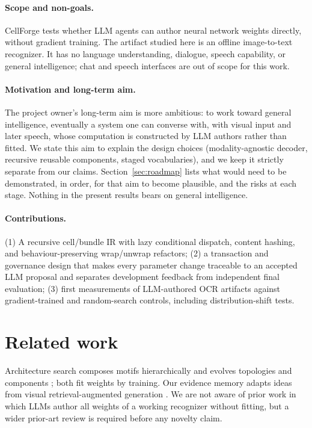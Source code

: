 \documentclass[11pt]{article}
\begin{document}
\paragraph{Scope and non-goals.}
CellForge tests whether LLM agents can author neural network weights directly, without
gradient training. The artifact studied here is an offline image-to-text recognizer. It has
no language understanding, dialogue, speech capability, or general intelligence; chat and
speech interfaces are out of scope for this work.

\paragraph{Motivation and long-term aim.}
The project owner's long-term aim is more ambitious: to work toward general intelligence,
eventually a system one can converse with, with visual input and later speech, whose
computation is constructed by LLM authors rather than fitted. We state this aim to explain
the design choices (modality-agnostic decoder, recursive reusable components, staged
vocabularies), and we keep it strictly separate from our claims. Section~\ref{sec:roadmap}
lists what would need to be demonstrated, in order, for that aim to become plausible, and
the risks at each stage. Nothing in the present results bears on general intelligence.

\paragraph{Contributions.}
(1) A recursive cell/bundle IR with lazy conditional dispatch, content hashing, and
behaviour-preserving wrap/unwrap refactors; (2) a transaction and governance design that
makes every parameter change traceable to an accepted LLM proposal and separates
development feedback from independent final evaluation; (3) first measurements of
LLM-authored OCR artifacts against gradient-trained and random-search controls, including
distribution-shift tests.

\section{Related work}
Architecture search composes motifs hierarchically \cite{liu2018hierarchical} and evolves
topologies and components \cite{miikkulainen2017evolving}; both fit weights by training.
Our evidence memory adapts ideas from visual retrieval-augmented generation
\cite{yu2024visrag,sun2025visrag2,wang2026vimrag}. We are not aware of prior work in which
LLMs author all weights of a working recognizer without fitting, but a wider prior-art review
is required before any novelty claim.
\end{document}
